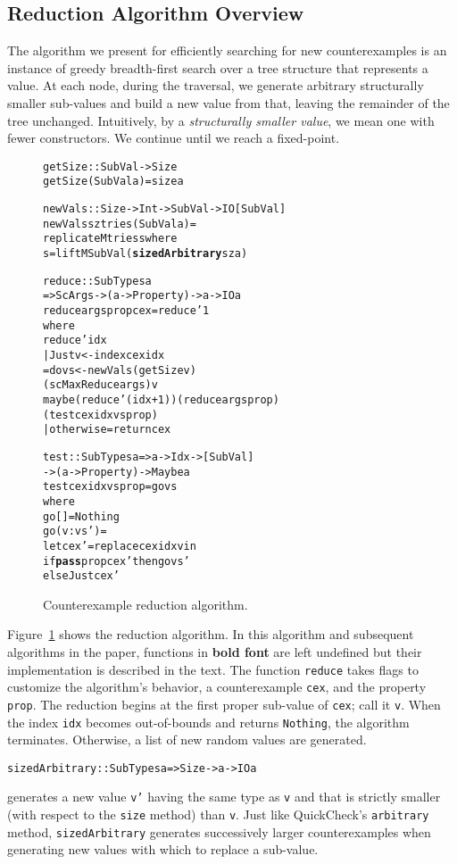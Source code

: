 \documentclass{sigplanconf}
\newenvironment{code}{\begin{alltt}\footnotesize}{\end{alltt}}
\newcommand{\ttp}[1]{\texttt{#1}}
\newcommand{\undef}[1]{{\bf #1}}
\begin{document}
\subsection{Reduction Algorithm Overview}\label{sec:reduct}
The algorithm we present for efficiently searching for new counterexamples is an
instance of greedy breadth-first search over a tree structure that represents a
value.  At each node, during the traversal, we generate arbitrary
structurally smaller sub-values and build a new value from that, leaving
the remainder of the tree unchanged.  Intuitively, by a \emph{structurally
  smaller value}, we mean one with fewer constructors.  We continue until we
reach a fixed-point.


\begin{figure}[ht]
  \begin{code}
getSize :: SubVal -> Size
getSize (SubVal a) = size a

newVals :: Size -> Int -> SubVal -> IO [SubVal]
newVals sz tries (SubVal a) =
  replicateM tries s where
  s = liftM SubVal (\undef{sizedArbitrary} sz a)

reduce :: SubTypes a
  => ScArgs -> (a -> Property) -> a -> IO a
reduce args prop cex = reduce' 1
  where
  reduce' idx
    | Just v <- index cex idx
    = do vs <- newVals (getSize v)
                 (scMaxReduce args) v
         maybe (reduce' (idx+1)) (reduce args prop)
               (test cex idx vs prop)
    | otherwise = return cex

test :: SubTypes a => a -> Idx -> [SubVal]
     -> (a -> Property) -> Maybe a
test cex idx vs prop = go vs
  where
  go []      = Nothing
  go (v:vs') =
    let cex' = replace cex idx v in
    if \undef{pass} prop cex' then go vs'
      else Just cex'
  \end{code}
  \caption{Counterexample reduction algorithm.\label{fig:reduction}}
\end{figure}

Figure~\ref{fig:reduction} shows the reduction algorithm.  In this algorithm and
subsequent algorithms in the paper, functions in {\bf bold font} are left
undefined but their implementation is described in the text.  The function
\ttp{reduce} takes flags to customize the algorithm's behavior, a counterexample
\ttp{cex}, and the property \ttp{prop}.  The reduction begins at the first
proper sub-value of \ttp{cex}; call it \ttp{v}.  When the index \ttp{idx}
becomes out-of-bounds and returns \ttp{Nothing}, the algorithm terminates.
Otherwise, a list of new random values are generated.
%
\begin{code}
sizedArbitrary :: SubTypes a => Size -> a -> IO a
\end{code}
%
\noindent
generates a new value \ttp{v'} having the same type as \ttp{v} and that is
strictly smaller (with respect to the \ttp{size} method) than \ttp{v}.  Just
like QuickCheck's \ttp{arbitrary} method, \ttp{sizedArbitrary} generates
successively larger counterexamples when generating new values with which to
replace a sub-value.
\end{document}
